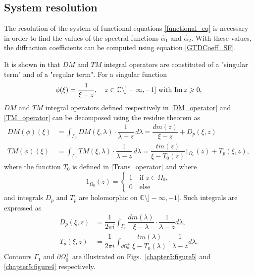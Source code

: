 \subsection{System resolution}
\label{Chapter5:System_resolution}

The resolution of the system of functional equations \eqref{functional_eq} is necessary in order to find the values of the spectral functions $\hat{\alpha}_1 $ and $\hat{\alpha}_2 $. With these values, the diffraction coefficients can be computed using equation \eqref{GTDCoeff_SF}. 

It is shown in \cite{CroisilleLebeau} that $DM$ and $TM$ integral operators are constituted of a "singular term" and of a "regular term". For a singular function 
\begin{equation}
\label{Chapter5:arbitrary_function}
\phi(\xi) = \dfrac{1}{\xi - z},  \quad z \in \mathbb{C}\setminus ]-\infty,-1] \text{ with } {\rm Im} \, z \geqslant 0,
\end{equation}
$DM$ and $TM$ integral operators defined respectively in \eqref{DM_operator} and \eqref{TM_operator} can be decomposed using the residue theorem as
\begin{subequations}
\label{Int_op_decomp}
\begin{align}
\label{Int_op_decomp_DM}
DM(\phi)(\xi) &= \int_{\Gamma_0} DM(\xi,\lambda) \cdot \dfrac{1}{\lambda - z} \, d \lambda = \dfrac{dm(z)}{\xi - z}  + D_p(\xi,z) \\
\label{Int_op_decomp_TM}
TM(\phi)(\xi) &= \int_{\Gamma_0} TM(\xi,\lambda) \cdot \dfrac{1}{\lambda - z} \, d \lambda = \dfrac{tm(z) }{\xi - T_0(z)} 1_{\Omega_0}(z) + T_p(\xi,z),
\end{align}
\end{subequations}
where the function $T_0$ is defined in \eqref{Trans_operator} and where
\begin{equation}
1_{\Omega_0}(z) = 
\begin{cases}
1 \quad \text{if } z  \in \Omega_0, \\
0 \quad \text{else}
\end{cases}
\end{equation}
and integrals $D_p$ and $T_p$ are holomorphic on $\mathbb{C}\setminus ]-\infty,-1]$. Such integrals are expressed as
\begin{subequations}
\label{holomorphic_functions}
\begin{align}
\label{defDp}
D_p(\xi,z) &= \dfrac{1}{2\pi i}\int_{\Gamma_1} \dfrac{dm(\lambda)}{\xi-\lambda} \cdot \dfrac{1}{\lambda - z} d\lambda, \\
\label{defTp}
T_p(\xi,z) &= \dfrac{1}{2\pi i}\int_{\partial \Omega_0^+}  \dfrac{tm(\lambda)}{\xi-T_0(\lambda)} \cdot \dfrac{1}{\lambda - z} d\lambda.
\end{align}
\end{subequations}
Contours $\Gamma_1$ and $\partial \Omega_0^+$ are illustrated on Figs.~\ref{chapter5:figure5} and \ref{chapter5:figure4} respectively.

